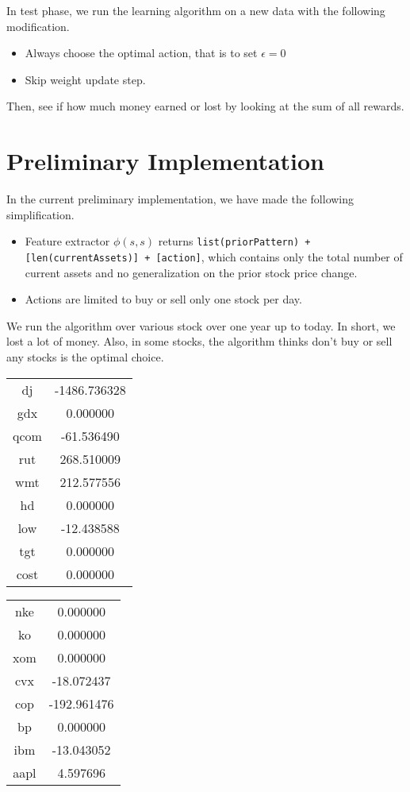 \documentclass[12pt]{article}
\begin{document}
In test phase, we run the learning algorithm on a new data with the
following modification.

\begin{itemize}
\item Always choose the optimal action, that is to set $\epsilon = 0$
\item Skip weight update step.
\end{itemize}

Then, see if how much money earned or lost by looking at the sum of
all rewards.

\section{Preliminary Implementation}

In the current preliminary implementation, we have made the following
simplification.

\begin{itemize}
\item Feature extractor $\phi(s, s)$ returns
  \verb|list(priorPattern) + [len(currentAssets)] + [action]|, which
  contains only the total number of current assets and no
  generalization on the prior stock price change.

  \item Actions are limited to buy or sell only one stock per day.
\end{itemize}

We run the algorithm over various stock over one year up to today. In
short, we lost a lot of money. Also, in some stocks, the algorithm
thinks don't buy or sell any stocks is the optimal choice. 

\begin{tabular}{|c|c|}
  \hline 
dj & -1486.736328 \\ 
gdx & 0.000000 \\ 
qcom & -61.536490 \\ 
rut & 268.510009 \\ 
wmt & 212.577556 \\ 
hd & 0.000000 \\ 
low & -12.438588 \\ 
tgt & 0.000000 \\ 
cost & 0.000000 \\
\hline
\end{tabular}
\begin{tabular}{|c|c|}
\hline
nke & 0.000000 \\ 
ko & 0.000000 \\ 
xom & 0.000000 \\ 
cvx & -18.072437 \\ 
cop & -192.961476 \\ 
bp & 0.000000 \\ 
ibm & -13.043052 \\ 
aapl & 4.597696 \\
\hline
\end{tabular}
\end{document}
